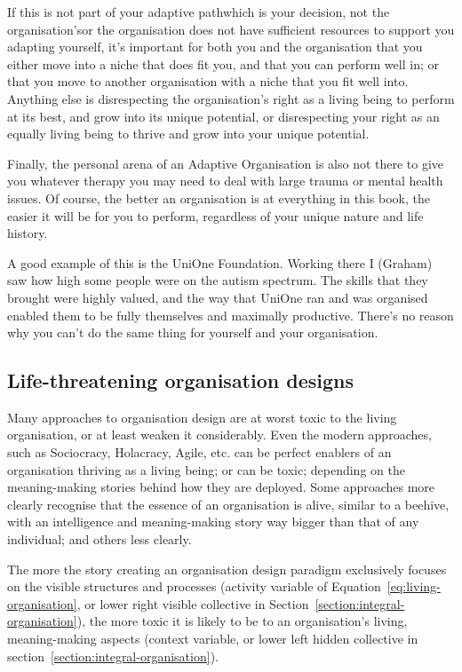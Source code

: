 If this is not part of your adaptive path\textemdash which is your decision, not the organisation's\textemdash or the organisation does not have sufficient resources to support you adapting yourself, it's important for both you and the organisation that you either move into a niche that does fit you, and that you can perform well in; or that you move to another organisation with a niche that you fit well into. Anything else is disrespecting the organisation’s right as a living being to perform at its best, and grow into its unique potential, or disrespecting your right as an equally living being to thrive and grow into your unique potential.


Finally, the personal arena of an Adaptive Organisation   is also not there to give you whatever therapy you may need to deal with large trauma or mental health issues. Of course, the better an organisation is at everything in this book, the easier it will be for you to perform, regardless of your unique nature and life history.


A good example of this is the UniOne Foundation.   Working there I (Graham) saw how high some people were on the autism spectrum. The skills that they brought were highly valued, and the way that UniOne ran and was organised enabled them to be fully themselves and maximally productive. There's no reason why you can't do the same thing for yourself and your organisation.




\subsection{Life-threatening organisation designs}
Many approaches to organisation design  are at worst toxic to the living organisation, or at least weaken it considerably. Even the modern approaches, such as Sociocracy, Holacracy, Agile, etc. can be perfect enablers of an organisation thriving as a living being; or can be toxic; depending on the meaning\hyp{}making stories behind how they are deployed. Some approaches more clearly recognise that the essence of an organisation is alive, similar to a beehive, with an intelligence and meaning\hyp{}making story way bigger than that of any individual; and others less clearly. 


The more the story creating an organisation design paradigm exclusively focuses on the visible structures and processes (activity variable of Equation~\ref{eq:living-organisation}, or lower right visible collective in Section~\ref{section:integral-organisation}), the more toxic it is likely to be to an organisation’s living, meaning\hyp{}making aspects (context variable, or lower left hidden collective in section~\ref{section:integral-organisation}). 


